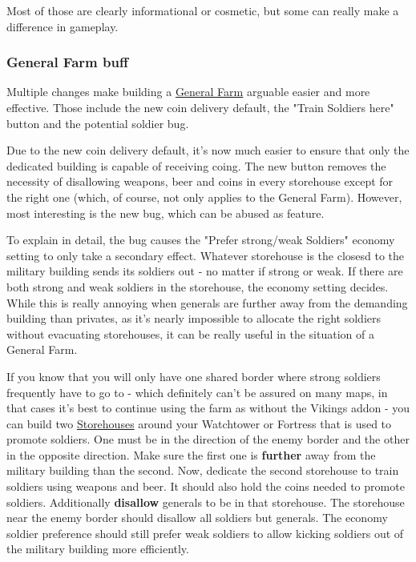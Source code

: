 \documentclass[12pt]{article}
\begin{document}
Most of those are clearly informational or cosmetic, but some can really make a difference in gameplay.

\subsubsection{General Farm buff}
\label{sec:generalfarmbuff}

Multiple changes make building a \hyperref[sec:generalfarm]{General Farm} arguable easier and more effective. Those include the new coin delivery default, the "Train Soldiers here" button and the potential soldier bug.

Due to the new coin delivery default, it's now much easier to ensure that only the dedicated building is capable of receiving coing. The new button removes the necessity of disallowing weapons, beer and coins in every storehouse except for the right one (which, of course, not only applies to the General Farm). However, most interesting is the new bug, which can be abused as feature.

To explain in detail, the bug causes the "Prefer strong/weak Soldiers" economy setting to only take a secondary effect. Whatever storehouse is the closesd to the military building sends its soldiers out - no matter if strong or weak. If there are both strong and weak soldiers in the storehouse, the economy setting decides. While this is really annoying when generals are further away from the demanding building than privates, as it's nearly impossible to allocate the right soldiers without evacuating storehouses, it can be really useful in the situation of a General Farm.

If you know that you will only have one shared border where strong soldiers frequently have to go to - which definitely can't be assured on many maps, in that cases it's best to continue using the farm as without the Vikings addon - you can build two \hyperref[sec:storehouse]{Storehouses} around your Watchtower or Fortress that is used to promote soldiers. One must be in the direction of the enemy border and the other in the opposite direction. Make sure the first one is \textbf{further} away from the military building than the second. Now, dedicate the second storehouse to train soldiers using weapons and beer. It should also hold the coins needed to promote soldiers. Additionally \textbf{disallow} generals to be in that storehouse. The storehouse near the enemy border should disallow all soldiers but generals. The economy soldier preference should still prefer weak soldiers to allow kicking soldiers out of the military building more efficiently.
\end{document}
